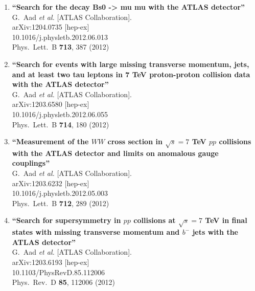 \documentclass{article}
\begin{document}
\begin{enumerate}
\item%
{\bf ``Search for the decay Bs0 -> mu mu with the ATLAS detector''}
  \\{}G.~Aad {\it et al.}  [ATLAS Collaboration].
  \\{}arXiv:1204.0735 [hep-ex]
    \\{}10.1016/j.physletb.2012.06.013
\\{}Phys.\ Lett.\ B {\bf 713}, 387 (2012) %


\item%
{\bf ``Search for events with large missing transverse momentum, jets, and at least two tau leptons in 7 TeV proton-proton collision data with the ATLAS detector''}
  \\{}G.~Aad {\it et al.}  [ATLAS Collaboration].
  \\{}arXiv:1203.6580 [hep-ex]
    \\{}10.1016/j.physletb.2012.06.055
\\{}Phys.\ Lett.\ B {\bf 714}, 180 (2012) %


\item%
{\bf ``Measurement of the $W W$ cross section in $\sqrt{s}=7$ TeV $pp$ collisions with the ATLAS detector and limits on anomalous gauge couplings''}
  \\{}G.~Aad {\it et al.}  [ATLAS Collaboration].
  \\{}arXiv:1203.6232 [hep-ex]
    \\{}10.1016/j.physletb.2012.05.003
\\{}Phys.\ Lett.\ B {\bf 712}, 289 (2012) %


\item%
{\bf ``Search for supersymmetry in $pp$ collisions at $\sqrt{s}=7$ TeV in final states with missing transverse momentum and $b^-$ jets with the ATLAS detector''}
  \\{}G.~Aad {\it et al.}  [ATLAS Collaboration].
  \\{}arXiv:1203.6193 [hep-ex]
    \\{}10.1103/PhysRevD.85.112006
\\{}Phys.\ Rev.\ D {\bf 85}, 112006 (2012) %



\end{enumerate}
\end{document}
